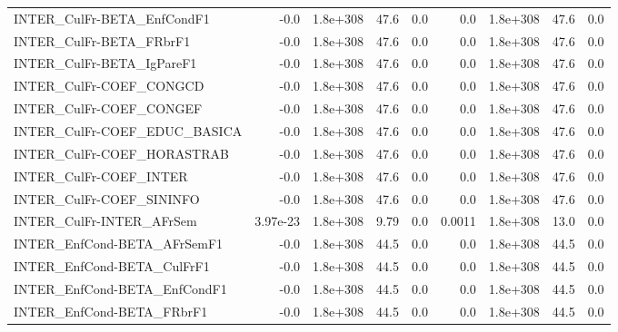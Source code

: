 \begin{tabular}{lrrrrrrrr}
INTER\_CulFr-BETA\_EnfCondF1           &        -0.0 &     1.8e+308 &    47.6 &      0.0 &        0.0 &    1.8e+308 &         47.6 &           0.0 \\
INTER\_CulFr-BETA\_FRbrF1              &        -0.0 &     1.8e+308 &    47.6 &      0.0 &        0.0 &    1.8e+308 &         47.6 &           0.0 \\
INTER\_CulFr-BETA\_IgPareF1            &        -0.0 &     1.8e+308 &    47.6 &      0.0 &        0.0 &    1.8e+308 &         47.6 &           0.0 \\
INTER\_CulFr-COEF\_CONGCD              &        -0.0 &     1.8e+308 &    47.6 &      0.0 &        0.0 &    1.8e+308 &         47.6 &           0.0 \\
INTER\_CulFr-COEF\_CONGEF              &        -0.0 &     1.8e+308 &    47.6 &      0.0 &        0.0 &    1.8e+308 &         47.6 &           0.0 \\
INTER\_CulFr-COEF\_EDUC\_BASICA         &        -0.0 &     1.8e+308 &    47.6 &      0.0 &        0.0 &    1.8e+308 &         47.6 &           0.0 \\
INTER\_CulFr-COEF\_HORASTRAB           &        -0.0 &     1.8e+308 &    47.6 &      0.0 &        0.0 &    1.8e+308 &         47.6 &           0.0 \\
INTER\_CulFr-COEF\_INTER               &        -0.0 &     1.8e+308 &    47.6 &      0.0 &        0.0 &    1.8e+308 &         47.6 &           0.0 \\
INTER\_CulFr-COEF\_SININFO             &        -0.0 &     1.8e+308 &    47.6 &      0.0 &        0.0 &    1.8e+308 &         47.6 &           0.0 \\
INTER\_CulFr-INTER\_AFrSem             &    3.97e-23 &     1.8e+308 &    9.79 &      0.0 &     0.0011 &    1.8e+308 &         13.0 &           0.0 \\
INTER\_EnfCond-BETA\_AFrSemF1          &        -0.0 &     1.8e+308 &    44.5 &      0.0 &        0.0 &    1.8e+308 &         44.5 &           0.0 \\
INTER\_EnfCond-BETA\_CulFrF1           &        -0.0 &     1.8e+308 &    44.5 &      0.0 &        0.0 &    1.8e+308 &         44.5 &           0.0 \\
INTER\_EnfCond-BETA\_EnfCondF1         &        -0.0 &     1.8e+308 &    44.5 &      0.0 &        0.0 &    1.8e+308 &         44.5 &           0.0 \\
INTER\_EnfCond-BETA\_FRbrF1            &        -0.0 &     1.8e+308 &    44.5 &      0.0 &        0.0 &    1.8e+308 &         44.5 &           0.0 \\

\end{tabular}
